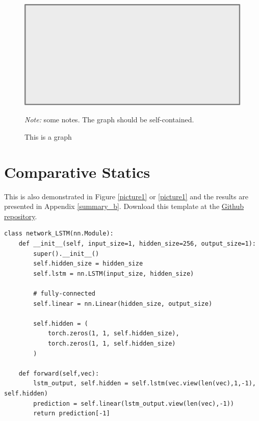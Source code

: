 \documentclass[letterpaper]{article}
\begin{document}
\begin{figure}[H]
  \centering
  \caption{This is a graph}
  \includegraphics[scale=0.5]{Graph/pic.pdf}
  \hspace*{-0.6cm}
  \begin{minipage}{0.9\textwidth}
    \onehalfspacing
    \vspace*{0.12cm}
    \begin{tablenotes}
      \footnotesize
      \item\textit{Note:} some notes. The graph should be self-contained. \lipsum[65]
    \end{tablenotes}
  \end{minipage}
\end{figure}

\section{Comparative Statics}

This is also demonstrated in Figure \ref{picture1} or \cref{picture1} and the results are presented in Appendix \ref{summary_b}. Download this template at the \href{https://github.com/howardhsumail/Paper-LaTeX-Template.git}{Github repository}. \lipsum[104] 

\begin{lstlisting}[style=python_code, caption={Long short-term memory}, label=mypythoncode]
class network_LSTM(nn.Module):
    def __init__(self, input_size=1, hidden_size=256, output_size=1):
        super().__init__()
        self.hidden_size = hidden_size
        self.lstm = nn.LSTM(input_size, hidden_size)

        # fully-connected
        self.linear = nn.Linear(hidden_size, output_size)

        self.hidden = (
            torch.zeros(1, 1, self.hidden_size),
            torch.zeros(1, 1, self.hidden_size)
        )

    def forward(self,vec):
        lstm_output, self.hidden = self.lstm(vec.view(len(vec),1,-1), self.hidden)
        prediction = self.linear(lstm_output.view(len(vec),-1))
        return prediction[-1]
\end{lstlisting}
\end{document}
